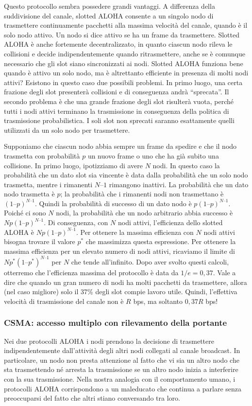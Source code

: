 Questo protocollo sembra possedere grandi vantaggi. A differenza della suddivisione del canale, slotted ALOHA consente a un singolo nodo di trasmettere continuamente pacchetti alla massima velocità del canale, quando è il solo nodo attivo. Un nodo si dice attivo se ha un frame da trasmettere. Slotted ALOHA è anche fortemente decentralizzato, in quanto ciascun nodo rileva le collisioni e decide indipendentemente quando ritrasmettere, anche se è comunque necessario che gli slot siano sincronizzati ai nodi. Slotted ALOHA funziona bene quando è attivo un solo nodo, ma è altrettanto efficiente in presenza di molti nodi attivi? Esistono in questo caso due possibili problemi. In primo luogo, una certa frazione degli slot presenterà collisioni e di conseguenza andrà “sprecata”. Il secondo problema è che una grande frazione degli slot risulterà vuota, perché tutti i nodi attivi terminano la trasmissione in conseguenza della politica di trasmissione probabilistica. I soli slot non sprecati saranno esattamente quelli utilizzati da un solo nodo per trasmettere.

Supponiamo che ciascun nodo abbia sempre un frame da spedire e che il nodo trasmetta con probabilità $p$ un nuovo frame o uno che ha già subito una collisione. In primo luogo, ipotizziamo di avere $N$ nodi. In questo caso la probabilità che un dato slot sia vincente è data dalla probabilità che un solo nodo trasmetta, mentre i rimanenti $N – 1$ rimangono inattivi. La probabilità che un dato nodo trasmetta è $p$; la probabilità che i rimanenti nodi non trasmettano è $(1 – p)^{N–1}$. Quindi la probabilità di successo di un dato nodo è $p(1 – p)^{N –1}$. Poiché ci sono $N$ nodi, la probabilità che un nodo arbitrario abbia successo è $Np(1 – p)^{N –1}$. Di conseguenza, con $N$ nodi attivi, l’efficienza dello slotted ALOHA è $Np(1 – p)^{N–1}$. Per ottenere la massima efficienza con $N$ nodi attivi bisogna trovare il valore $p^*$ che massimizza questa espressione. Per ottenere la massima efficienza per un elevato numero di nodi attivi, ricaviamo il limite di $Np^* (1 – p^*)^{N –1}$ per $N$ che tende all’infinito. Dopo aver svolto questi calcoli, otterremo che l’efficienza massima del protocollo è data da $1/e = 0,37$. Vale a dire che quando un gran numero di nodi ha molti pacchetti da trasmettere, allora (nel caso migliore) solo il 37\% degli slot compie lavoro utile. Quindi, l’effettiva velocità di trasmissione del canale non è $R$ bps, ma soltanto $0,37 R$ bps!

\subsubsection{CSMA: accesso multiplo con rilevamento della portante}
Nei due protocolli ALOHA i nodi prendono la decisione di trasmettere indipendentemente dall’attività degli altri nodi collegati al canale broadcast. In particolare, un nodo non presta attenzione al fatto che vi sia un altro nodo che sta trasmettendo né arresta la trasmissione se un altro nodo inizia a interferire con la sua trasmissione. Nella nostra analogia con il comportamento umano, i protocolli ALOHA corrispondono a un maleducato che continua a parlare senza preoccuparsi del fatto che altri stiano conversando tra loro.

